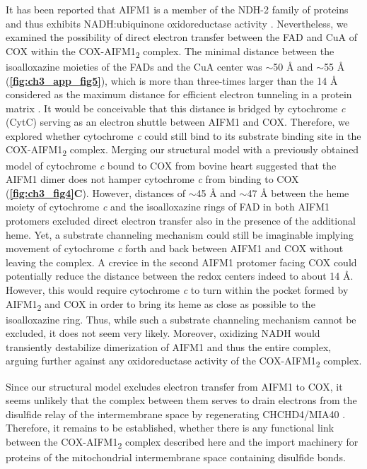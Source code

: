 It has been reported that AIFM1 is a member of the NDH-2 family of proteins \cite{RN51} and thus exhibits NADH:ubiquinone oxidoreductase activity \cite{RN52}. Nevertheless, we examined the possibility of direct electron transfer between the FAD and CuA of COX within the COX-AIFM1\textsubscript{2} complex. The minimal distance between the isoalloxazine moieties of the FADs and the CuA center was $\sim$50 Å and $\sim$55 Å (\textbf{\autoref{fig:ch3_app_fig5}}), which is more than three-times larger than the 14 Å considered as the maximum distance for efficient electron tunneling in a protein matrix \cite{RN53}. It would be conceivable that this distance is bridged by cytochrome \emph{c} (CytC) serving as an electron shuttle between AIFM1 and COX. Therefore, we explored whether cytochrome \emph{c} could still bind to its substrate binding site in the COX-AIFM1\textsubscript{2} complex. Merging our structural model with a previously obtained model of cytochrome \emph{c} bound to COX from bovine heart \cite{RN54} suggested that the AIFM1 dimer does not hamper cytochrome \emph{c} from binding to COX (\textbf{\autoref{fig:ch3_fig4}C}). However, distances of $\sim$45 Å and $\sim$47 Å between the heme moiety of cytochrome \emph{c} and the isoalloxazine rings of FAD in both AIFM1 protomers excluded direct electron transfer also in the presence of the additional heme. Yet, a substrate channeling mechanism could still be imaginable implying movement of cytochrome \emph{c} forth and back between AIFM1 and COX without leaving the complex. A crevice in the second AIFM1 protomer facing COX could potentially reduce the distance between the redox centers indeed to about 14 Å. However, this would require cytochrome \emph{c} to turn within the pocket formed by AIFM1\textsubscript{2} and COX in order to bring its heme as close as possible to the isoalloxazine ring. Thus, while such a substrate channeling mechanism cannot be excluded, it does not seem very likely. Moreover, oxidizing NADH would transiently destabilize dimerization of AIFM1 \cite{RN8} and thus the entire complex, arguing further against any oxidoreductase activity of the COX-AIFM1\textsubscript{2} complex.

Since our structural model excludes electron transfer from AIFM1 to COX, it seems unlikely that the complex between them serves to drain electrons from the disulfide relay of the intermembrane space by regenerating CHCHD4/MIA40 \cite{RN6}. Therefore, it remains to be established, whether there is any functional link between the COX-AIFM1\textsubscript{2} complex described here and the import machinery for proteins of the mitochondrial intermembrane space containing disulfide bonds.

